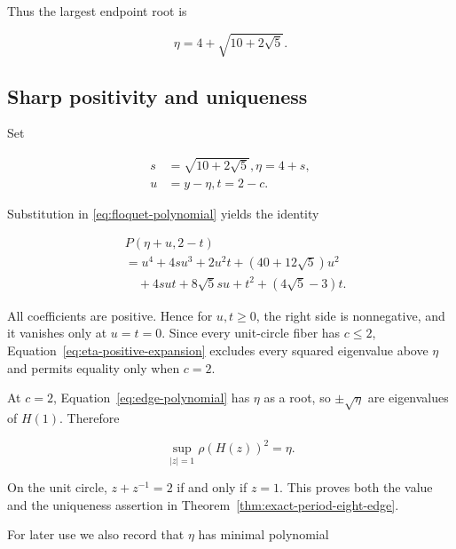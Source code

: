 Thus the largest endpoint root is

\begin{equation}
\label{eq:eta-definition}
\eta=4+\sqrt{10+2\sqrt{5}}.
\end{equation}

\subsection{Sharp positivity and uniqueness}

Set

\begin{equation}
\begin{aligned}
s&=\sqrt{10+2\sqrt{5}},       \eta=4+s, \\
u&=y-\eta,                   t=2-c.
\end{aligned}
\end{equation}

Substitution in \eqref{eq:floquet-polynomial} yields the identity

\begin{equation}
\label{eq:eta-positive-expansion}
\begin{aligned}
&P(\eta+u,2-t) \\
&=u^{4}+4s u^{3}+2u^{2}t+(40+12\sqrt{5})u^{2} \\
&\quad +4s ut+8\sqrt{5}s u+t^{2}+(4\sqrt{5}-3)t.
\end{aligned}
\end{equation}

All coefficients are positive. Hence for \(u,t\geq 0\), the right side is
nonnegative, and it vanishes only at \(u=t=0\). Since every unit-circle fiber
has \(c\leq 2\), Equation~\eqref{eq:eta-positive-expansion} excludes every squared eigenvalue above \(\eta\) and
permits equality only when \(c=2\).

At \(c=2\), Equation~\eqref{eq:edge-polynomial} has \(\eta\) as a root, so \(\pm\sqrt{\eta}\) are eigenvalues
of \(H(1)\). Therefore

\begin{equation}
\label{eq:exact-infinite-edge}
\sup_{\lvert z\rvert=1} \rho(H(z))^{2}=\eta.
\end{equation}

On the unit circle, \(z+z^{-1}=2\) if and only if \(z=1\). This proves both the
value and the uniqueness assertion in Theorem~\ref{thm:exact-period-eight-edge}.

For later use we also record that \(\eta\) has minimal polynomial

